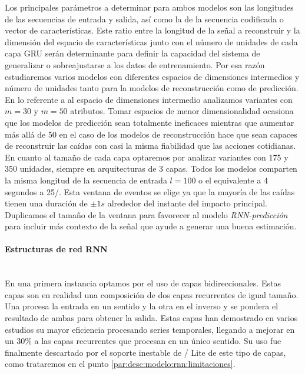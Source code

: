 Los principales parámetros a determinar para ambos modelos son las longitudes de las secuencias de entrada y salida, así como la de la secuencia codificada o vector de características. Este ratio entre la longitud de la señal a reconstruir y la dimensión del espacio de características junto con el número de unidades de cada capa GRU serán determinante para definir la capacidad del sistema de generalizar o sobreajustarse a los datos de entrenamiento. Por esa razón estudiaremos varios modelos con diferentes espacios de dimensiones intermedios y número de unidades tanto para la modelos de reconstrucción como de predicción. En lo referente a al espacio de dimensiones intermedio analizamos variantes con $m=30$ y $m=50$ atributos. Tomar espacios de menor dimensionalidad ocasiona que los modelos de predicción sean totalmente ineficaces mientras que aumentar más allá de 50 en el caso de los modelos de reconstrucción hace que sean capaces de reconstruir las caídas con casi la misma fiabilidad que las acciones cotidianas. En cuanto al tamaño de cada capa optaremos por analizar variantes con 175 y 350 unidades, siempre en arquitecturas de 3 capas. Todos los modelos comparten la misma longitud de la secuencia de entrada $l=100$ o el equivalente a 4 segundos a 25\hz/. Esta ventana de eventos se elige ya que la mayoría de las caídas tienen una duración de $\pm 1s$ \cite{Sucerquia2017,Liu2018,Hassan2019} alrededor del instante del impacto principal. Duplicamos el tamaño de la ventana para favorecer al modelo \textit{RNN-predicción} para incluir más contexto de la señal que ayude a generar una buena estimación.

\paragraph{Estructuras de red RNN}\\
En una primera instancia optamos por el uso de capas bidireccionales\cite{Schuster1997}. Estas capas son en realidad una composición de dos capas recurrentes de igual tamaño. Una procesa la entrada en un sentido y la otra en el inverso y se pondera el resultado de ambas para obtener la salida. Estas capas han demostrado en varios estudios \cite{Zhao2017, Su2018} su mayor eficiencia procesando series temporales, llegando a mejorar en un 30\% a las capas recurrentes que procesan en un único sentido. Su uso fue finalmente descartado por el soporte inestable de \tensorflow/ Lite de este tipo de capas, como trataremos en el punto \ref{par:desc:modelo:rnn:limitaciones}.

